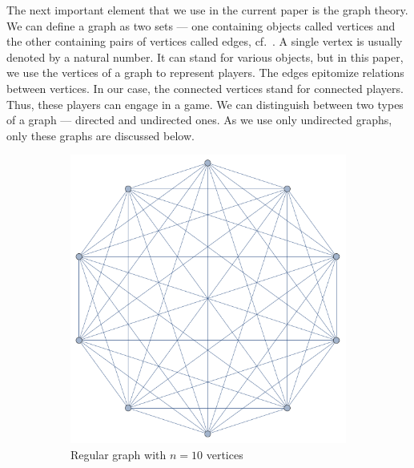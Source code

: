 \documentclass[english, twoside, 12pt, a4paper]{article}
\theoremstyle{definition}
\theoremstyle{plain}
\theoremstyle{remark}
\begin{document}
The next important element that we use in the current paper is the graph theory. We can define a graph as two sets --- one containing objects called vertices and the other containing pairs of vertices called edges, cf.~\cite{ross1985discrete}. A single vertex is usually denoted by a natural number. It can stand for various objects, but in this paper, we use the vertices of a graph to represent players. The edges epitomize relations between vertices. In our case, the connected vertices stand for connected players. Thus, these players can engage in a game. We can distinguish between two types of a graph --- directed and undirected ones. As we use only undirected graphs, only these graphs are discussed below.

 \begin{figure}[hbt]
  \centering
  \begin{subfigure}[t]{0.40\textwidth}
    \includegraphics[width=\textwidth]{../ramsza/figs/graph_complete.pdf}
    \caption{Regular graph with \(n = 10\) vertices}
    \label{fig:graphsa}
  \end{subfigure}
  \hfill
  \begin{subfigure}[t]{0.40\textwidth}

\end{subfigure}
\end{figure}
\end{document}
